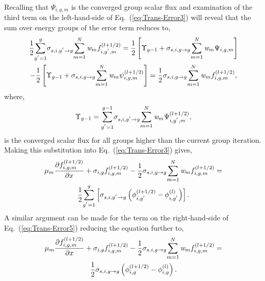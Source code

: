 	Recalling that ${\Psi}_{i,g,m}$ is the converged group scalar flux and examination of the third term
	on the left-hand-side of Eq.~(\ref{eq:Trans-Error3}) will reveal that the sum over energy
	groups of the error term reduces to,
	\begin{multline}
		\frac{1}{2}{\sum^{g}_{g^{'}=1}}{\sigma}_{s,i,g^{'}\rightarrow{g}}
		{{\sum^{N}_{m=1}\emph{w}_{m}{f}_{i,g^{'},m}^{\left({l+1/2}\right)}}} =
		\frac{1}{2}\left[\Upsilon_{g-1}
		+ {{\sigma}_{s,i,g\rightarrow{g}}{{\sum^{N}_{m=1}
		\emph{w}_{m}{\Psi}_{i,g,m}}}}
		\right] \\ - \frac{1}{2}\left[\Upsilon_{g-1}
		+ {{\sigma}_{s,i,g\rightarrow{g}}{{\sum^{N}_{m=1}
		\emph{w}_{m}\psi_{i,g,m}^{\left(l+1/2\right)}}}} \right]
		= \frac{1}{2}{\sigma}_{s,i,g\rightarrow{g}}{\sum^{N}_{m=1}\emph{w}_{m}}
		{f}_{i,g,m}^{\left({l+1/2}\right)},
	\label{eq:Trans-Error4}
	\end{multline}
	where, 
	\begin{equation}
		\Upsilon_{g-1} = {\sum^{g-1}_{g^{'}=1}}{\sigma}_{s,i,g^{'}\rightarrow{g}}{{\sum^{N}_{m=1}
		\emph{w}_{m}{\Psi}_{i,g^{'},m}^{\left({l+1/2}\right)}}},
	\end{equation}
	is the converged scalar flux for all groups higher than the current group iteration.
	Making this substitution into Eq.~(\ref{eq:Trans-Error3}) gives,
	\begin{multline}
		\mu_{m}\frac{\partial{{f}_{i,g,m}^{\left({l+1/2}\right)}}}{\partial{x}}+
		{\sigma}_{i,g}{{f}_{i,g,m}^{\left({l+1/2}\right)}} - 
		\frac{1}{2}{\sigma}_{s,i,g\rightarrow{g}}{\sum^{N}_{m=1}\emph{w}_{m}}
		{f}_{i,g,m}^{\left({l+1/2}\right)} = \\
		\frac{1}{2}{\sum^{g}_{g^{'}=1}}\left[  {\sigma}_{s,i,g^{'}\rightarrow{g}}
		\left({\phi_{i,g^{'}}^{\left({l+1/2}\right)}}-{\phi_{i,g^{'}}^{\left({l}\right)}}\right)\right].
	\label{eq:Trans-Error5}
	\end{multline}
	A similar argument can be made for the term on the right-hand-side of Eq.~(\ref{eq:Trans-Error5})
	reducing the equation further to,
		\begin{multline}
		\mu_{m}\frac{\partial{{f}_{i,g,m}^{\left({l+1/2}\right)}}}{\partial{x}}+
		{\sigma}_{i,g}{{f}_{i,g,m}^{\left({l+1/2}\right)}} - 
		\frac{1}{2}{\sigma}_{s,i,g\rightarrow{g}}{\sum^{N}_{m=1}\emph{w}_{m}}
		{f}_{i,g,m}^{\left({l+1/2}\right)} = \\
		\frac{1}{2}{\sigma}_{s,i,g\rightarrow{g}}
		\left({\phi_{i,g}^{\left({l+1/2}\right)}}-{\phi_{i,g}^{\left({l}\right)}}\right).
	\label{eq:Trans-Error6}
	\end{multline}
